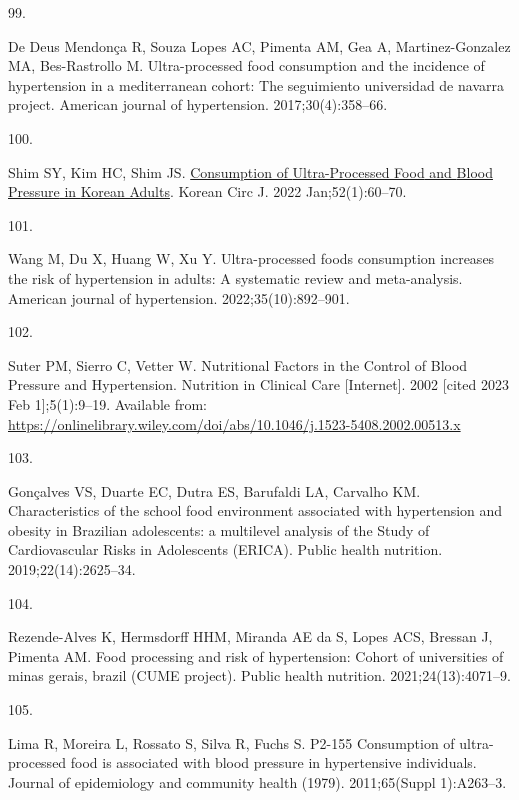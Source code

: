 \documentclass[
]{article}
\newlength{\cslhangindent}
\newlength{\csllabelwidth}
\newlength{\cslentryspacingunit} %
\newenvironment{CSLReferences}[2] %
 {%
  \setlength{\parindent}{0pt}
  \ifodd #1
  \let\oldpar\par
  \def\par{\hangindent=\cslhangindent\oldpar}
  \fi
  \setlength{\parskip}{#2\cslentryspacingunit}
 }%
 {}
\newcommand{\CSLLeftMargin}[1]{\parbox[t]{\csllabelwidth}{#1}}
\newcommand{\CSLRightInline}[1]{\parbox[t]{\linewidth - \csllabelwidth}{#1}\break}
\begin{document}
\begin{CSLReferences}{0}{0}
\leavevmode{}%
\CSLLeftMargin{99. }%
\CSLRightInline{De Deus Mendonça R, Souza Lopes AC, Pimenta AM, Gea A,
Martinez-Gonzalez MA, Bes-Rastrollo M. Ultra-processed food consumption
and the incidence of hypertension in a mediterranean cohort: The
seguimiento universidad de navarra project. American journal of
hypertension. 2017;30(4):358--66. }

\leavevmode{}%
\CSLLeftMargin{100. }%
\CSLRightInline{Shim SY, Kim HC, Shim JS.
\href{https://doi.org/10.4070/kcj.2021.0228}{Consumption of
{Ultra-Processed Food} and {Blood Pressure} in {Korean Adults}}. Korean
Circ J. 2022 Jan;52(1):60--70. }

\leavevmode{}%
\CSLLeftMargin{101. }%
\CSLRightInline{Wang M, Du X, Huang W, Xu Y. Ultra-processed foods
consumption increases the risk of hypertension in adults: {A} systematic
review and meta-analysis. American journal of hypertension.
2022;35(10):892--901. }

\leavevmode{}%
\CSLLeftMargin{102. }%
\CSLRightInline{Suter PM, Sierro C, Vetter W. Nutritional {Factors} in
the {Control} of {Blood Pressure} and {Hypertension}. Nutrition in
Clinical Care {[}Internet{]}. 2002 {[}cited 2023 Feb 1{]};5(1):9--19.
Available from:
\url{https://onlinelibrary.wiley.com/doi/abs/10.1046/j.1523-5408.2002.00513.x}}

\leavevmode{}%
\CSLLeftMargin{103. }%
\CSLRightInline{Gonçalves VS, Duarte EC, Dutra ES, Barufaldi LA,
Carvalho KM. Characteristics of the school food environment associated
with hypertension and obesity in Brazilian adolescents: a multilevel
analysis of the Study of Cardiovascular Risks in Adolescents (ERICA).
Public health nutrition. 2019;22(14):2625--34. }

\leavevmode{}%
\CSLLeftMargin{104. }%
\CSLRightInline{Rezende-Alves K, Hermsdorff HHM, Miranda AE da S, Lopes
ACS, Bressan J, Pimenta AM. Food processing and risk of hypertension:
{Cohort} of universities of minas gerais, brazil ({CUME} project).
Public health nutrition. 2021;24(13):4071--9. }

\leavevmode{}%
\CSLLeftMargin{105. }%
\CSLRightInline{Lima R, Moreira L, Rossato S, Silva R, Fuchs S. P2-155
Consumption of ultra-processed food is associated with blood pressure in
hypertensive individuals. Journal of epidemiology and community health
(1979). 2011;65(Suppl 1):A263--3. }


\end{CSLReferences}
\end{document}
